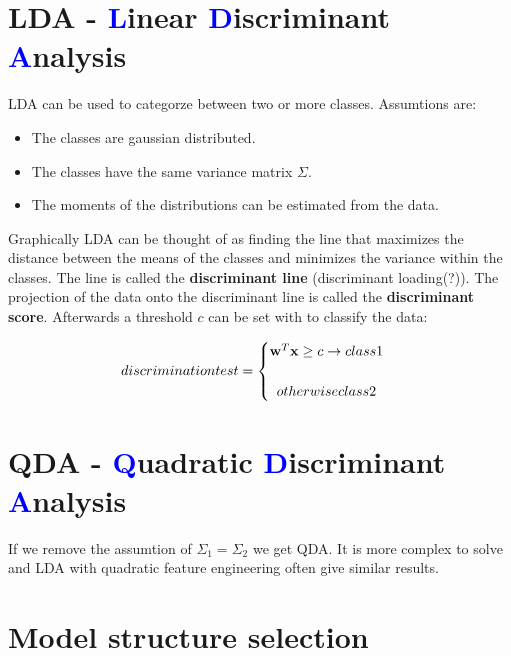 \section{LDA - \textcolor{blue}{L}inear \textcolor{blue}{D}iscriminant \textcolor{blue}{A}nalysis}
LDA can be used to categorze between two or more classes. Assumtions are:
\begin{itemize}
    \item The classes are gaussian distributed.
    \item The classes have the same variance matrix $\Sigma$.
    \item The moments of the distributions can be estimated from the data.
\end{itemize}
Graphically LDA can be thought of as finding the line that maximizes the distance between the means of the classes and minimizes the variance within the classes. The line is called the \textbf{discriminant line} (discriminant loading(?)). The projection of the data onto the discriminant line is called the \textbf{discriminant score}. Afterwards a threshold $c$ can be set with to classify the data:

\begin{equation}
    discrimination test = \begin{cases} 
    \mathbf{w}^T \mathbf{x} \geq c \rightarrow class 1 \\ \\
    \newline
    otherwise class 2
    \end{cases}
\end{equation}



\section{QDA - \textcolor{blue}{Q}uadratic \textcolor{blue}{D}iscriminant \textcolor{blue}{A}nalysis}
If we remove the assumtion of $\Sigma_1 = \Sigma_2$ we get QDA. It is more complex to solve and LDA with quadratic feature engineering often give similar results.

\section{Model structure selection}

